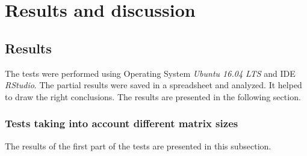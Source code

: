 \chapter{Results and discussion}
\label{sec:results}
\section{Results}
The tests were performed using Operating System \textit{Ubuntu 16.04 LTS} and IDE \textit{RStudio}. 
The partial results were saved in a spreadsheet and analyzed. It helped to draw the right conclusions.
The results are presented in the following section.

\subsection{Tests taking into account different matrix sizes}
The results of the first part of the tests are presented in this subsection.
